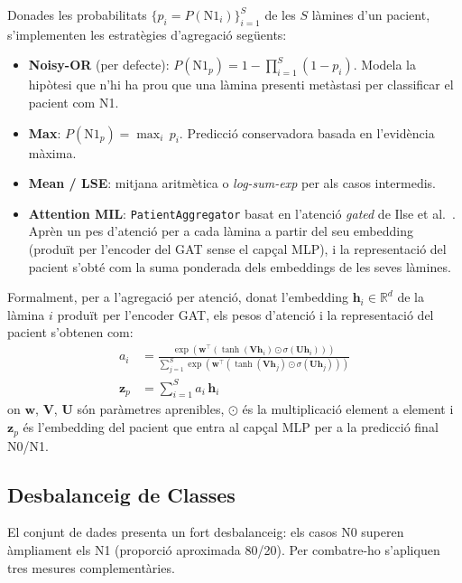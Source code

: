 \documentclass[10pt,a4paper,twocolumn,twoside]{article}
\begin{document}
Donades les probabilitats $\{p_i = P(\text{N1}_i)\}_{i=1}^{S}$ de les $S$ làmines d'un pacient, s'implementen
les estratègies d'agregació següents:

\begin{itemize}
    \item \textbf{Noisy-OR} (per defecte): $P(\text{N1}_{p}) = 1 - \prod_{i=1}^{S}(1 - p_i)$. Modela la
    hipòtesi que n'hi ha prou que una làmina presenti metàstasi per classificar el pacient com N1.
    \item \textbf{Max}: $P(\text{N1}_{p}) = \max_i\, p_i$. Predicció conservadora basada en l'evidència
    màxima.
    \item \textbf{Mean / LSE}: mitjana aritmètica o \textit{log-sum-exp} per als casos intermedis.
    \item \textbf{Attention MIL}: \texttt{PatientAggregator} basat en l'atenció \textit{gated} de Ilse et
    al.\ \cite{ilse2018attentionbaseddeepmultipleinstance}. Aprèn un pes d'atenció per a cada làmina a
    partir del seu embedding (produït per l'encoder del GAT sense el capçal MLP), i la representació del
    pacient s'obté com la suma ponderada dels embeddings de les seves làmines.
\end{itemize}

Formalment, per a l'agregació per atenció, donat l'embedding $\mathbf{h}_i \in \mathbb{R}^{d}$ de la
làmina $i$ produït per l'encoder GAT, els pesos d'atenció i la representació del pacient s'obtenen com:
\begin{align*}
  a_i &= \frac{
    \exp\!\left(\mathbf{w}^{\!\top}\!\left(\tanh(\mathbf{V}\mathbf{h}_i)\odot\sigma(\mathbf{U}\mathbf{h}_i)\right)\right)
  }{
    \displaystyle\sum_{j=1}^{S}\exp\!\left(\mathbf{w}^{\!\top}\!\left(\tanh(\mathbf{V}\mathbf{h}_j)\odot\sigma(\mathbf{U}\mathbf{h}_j)\right)\right)
  } \\[6pt]
  \mathbf{z}_p &= \sum_{i=1}^{S} a_i\,\mathbf{h}_i
\end{align*}
on $\mathbf{w}$, $\mathbf{V}$, $\mathbf{U}$ són paràmetres aprenibles, $\odot$ és la multiplicació
element a element i $\mathbf{z}_p$ és l'embedding del pacient que entra al capçal MLP per a la
predicció final N0/N1.

\subsection{Desbalanceig de Classes}

El conjunt de dades presenta un fort desbalanceig: els casos N0 superen àmpliament els N1 (proporció aproximada
80/20). Per combatre-ho s'apliquen tres mesures complementàries.
\end{document}
